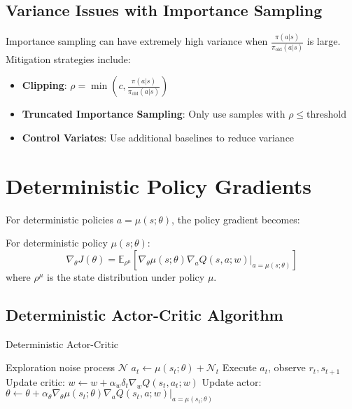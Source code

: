 \subsection{Variance Issues with Importance Sampling}

Importance sampling can have extremely high variance when $\frac{\pi(a|s)}{\pi_{\text{old}}(a|s)}$ is large. Mitigation strategies include:

\begin{itemize}
    \item \textbf{Clipping}: $\rho = \min(c, \frac{\pi(a|s)}{\pi_{\text{old}}(a|s)})$
    \item \textbf{Truncated Importance Sampling}: Only use samples with $\rho \leq \text{threshold}$
    \item \textbf{Control Variates}: Use additional baselines to reduce variance
\end{itemize}

\section{Deterministic Policy Gradients}

For deterministic policies $a = \mu(s; \theta)$, the policy gradient becomes:

\begin{theorem}
For deterministic policy $\mu(s; \theta)$:
\begin{equation}
\nabla_\theta J(\theta) = \mathbb{E}_{\rho^\mu} \left[ \nabla_\theta \mu(s; \theta) \nabla_a Q(s,a; w) \big|_{a=\mu(s; \theta)} \right]
\end{equation}
where $\rho^\mu$ is the state distribution under policy $\mu$.
\end{theorem}

\subsection{Deterministic Actor-Critic Algorithm}

\begin{algorithm}
\caption{Deterministic Actor-Critic}
\begin{algorithmic}
\REQUIRE Exploration noise process $\mathcal{N}$
        \STATE $a_t \leftarrow \mu(s_t; \theta) + \mathcal{N}_t$ 
        \STATE Execute $a_t$, observe $r_t, s_{t+1}$
        \STATE Update critic: $w \leftarrow w + \alpha_w \delta_t \nabla_w Q(s_t, a_t; w)$
        \STATE Update actor: $\theta \leftarrow \theta + \alpha_\theta \nabla_\theta \mu(s_t; \theta) \nabla_a Q(s_t, a; w)|_{a=\mu(s_t; \theta)}$
    \ENDFOR
\ENDFOR
\end{algorithmic}
\end{algorithm}


